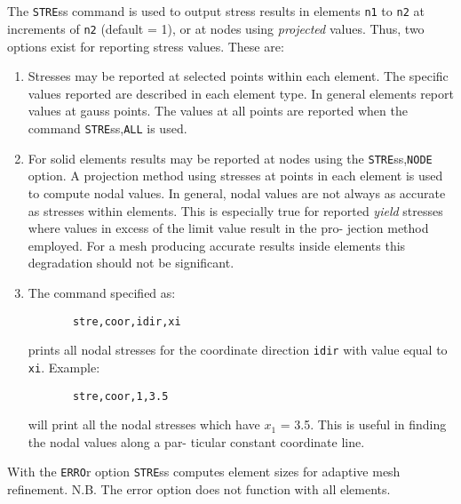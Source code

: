 \\{\smallskip}
\\{\smallskip}
\\{\smallskip}
\\{\smallskip}
\headb

The {\tt STRE}ss command is used to output stress
results in elements {\tt n1} to {\tt n2} at increments of {\tt n2}
(default = 1), or at nodes using {\it projected} values.  Thus,
two options exist for reporting stress values. These are:
\begin{enumerate}
\item{
Stresses may be reported at selected points within each
element.  The specific values reported are described in
each element type.  In general elements report values
at gauss points.  The values at all points are reported
when the command {\tt STRE}ss,{\tt ALL} is used.}
\item{
For solid elements results may be reported at nodes
using the {\tt STRE}ss,{\tt NODE} option.  A projection method
using stresses at points in each element is used to
compute nodal values.  In general, nodal values are not
always as accurate as stresses within elements.  This
is especially true for reported {\it yield} stresses where
values in excess of the limit value result in the pro-
jection method employed.  For a mesh producing accurate
results inside elements this degradation should not be
significant.}
\item{
The command specified as:

\begin{verbatim}
       stre,coor,idir,xi
\end{verbatim}
prints all nodal stresses for the coordinate  direction
{\tt idir} with value equal to {\tt xi}. Example:

\begin{verbatim}
       stre,coor,1,3.5
\end{verbatim}
will print all the nodal stresses which have $x_1$ = 3.5.
This is useful in finding the nodal values along a par-
ticular constant coordinate line.}
\end{enumerate}

With the {\tt ERRO}r option {\tt STRE}ss computes element sizes
for adaptive mesh refinement. N.B. The error option does not function with
all  elements.
\vfill\eject
